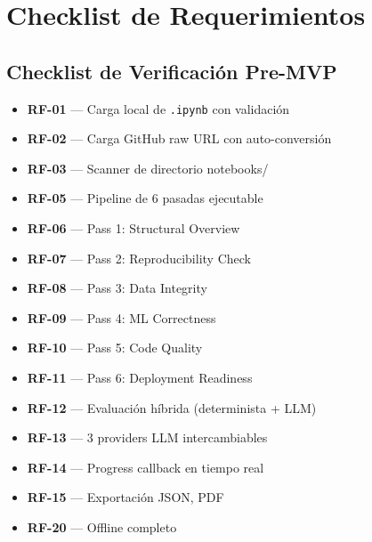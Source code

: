 \documentclass[12pt,a4paper]{article}
\begin{document}
\section{Checklist de Requerimientos}

\subsection{Checklist de Verificación Pre-MVP}
\begin{itemize}
  \item[{$\checkmark$}] \textbf{RF-01} --- Carga local de \texttt{.ipynb} con validación
  \item[{$\checkmark$}] \textbf{RF-02} --- Carga GitHub raw URL con auto-conversión
  \item[{$\checkmark$}] \textbf{RF-03} --- Scanner de directorio notebooks/
  \item[{$\checkmark$}] \textbf{RF-05} --- Pipeline de 6 pasadas ejecutable
  \item[{$\checkmark$}] \textbf{RF-06} --- Pass 1: Structural Overview
  \item[{$\checkmark$}] \textbf{RF-07} --- Pass 2: Reproducibility Check
  \item[{$\checkmark$}] \textbf{RF-08} --- Pass 3: Data Integrity
  \item[{$\checkmark$}] \textbf{RF-09} --- Pass 4: ML Correctness
  \item[{$\checkmark$}] \textbf{RF-10} --- Pass 5: Code Quality
  \item[{$\checkmark$}] \textbf{RF-11} --- Pass 6: Deployment Readiness
  \item[{${[\;]}$}] \textbf{RF-12} --- Evaluación híbrida (determinista + LLM)
  \item[{${[\;]}$}] \textbf{RF-13} --- 3 providers LLM intercambiables
  \item[{$\checkmark$}] \textbf{RF-14} --- Progress callback en tiempo real
  \item[{$\checkmark$}] \textbf{RF-15} --- Exportación JSON, PDF
  \item[{$\checkmark$}] \textbf{RF-20} --- Offline completo
\end{itemize}
\end{document}
